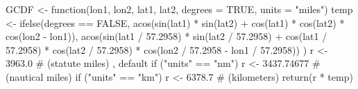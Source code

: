 \begin{Schunk}
\begin{Sinput}
 GCDF <- function(lon1, lon2, lat1, lat2, degrees = TRUE, units = "miles") {
   temp <- ifelse(degrees == FALSE,
     acos(sin(lat1) * sin(lat2) + cos(lat1) * cos(lat2) * cos(lon2 - lon1)),
     acos(sin(lat1 / 57.2958) * sin(lat2 / 57.2958) +
       cos(lat1 / 57.2958) * cos(lat2 / 57.2958) *
         cos(lon2 / 57.2958 - lon1 / 57.2958))
   )
   r <- 3963.0 # (statute miles) , default
   if ("units" == "nm") r <- 3437.74677 # (nautical miles)
   if ("units" == "km") r <- 6378.7 # (kilometers)
   return(r * temp)
 }
\end{Sinput}
\end{Schunk}

